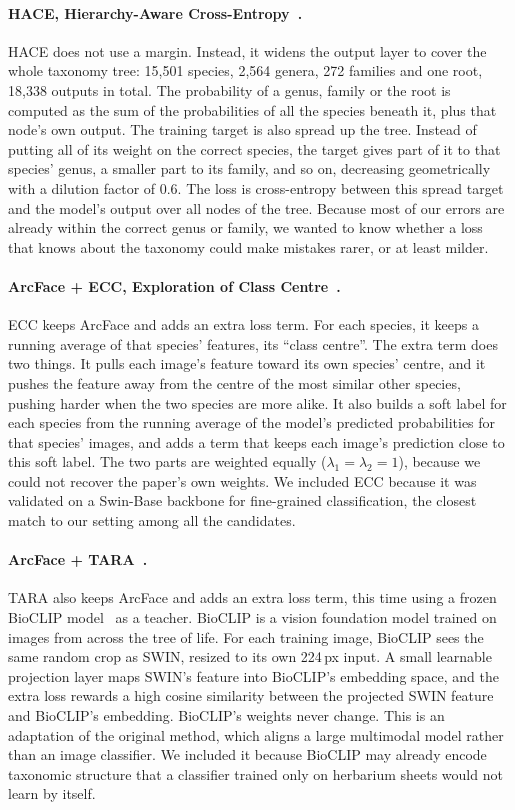 \documentclass[11pt]{article}
\begin{document}
\paragraph{HACE, Hierarchy-Aware Cross-Entropy~\citep{hace}.} HACE does not use a margin.
Instead, it widens the output layer to cover the whole taxonomy tree: 15{,}501 species,
2{,}564 genera, 272 families and one root, 18{,}338 outputs in total. The probability of
a genus, family or the root is computed as the sum of the probabilities of all the
species beneath it, plus that node's own output. The training target is also spread up
the tree. Instead of putting all of its weight on the correct species, the target gives
part of it to that species' genus, a smaller part to its family, and so on, decreasing
geometrically with a dilution factor of 0.6. The loss is cross-entropy between this
spread target and the model's output over all nodes of the tree. Because most of our
errors are already within the correct genus or family, we wanted to know whether a loss
that knows about the taxonomy could make mistakes rarer, or at least milder.

\paragraph{ArcFace + ECC, Exploration of Class Centre~\citep{ecc}.} ECC keeps ArcFace and
adds an extra loss term. For each species, it keeps a running average of that species'
features, its ``class centre''. The extra term does two things. It pulls each image's
feature toward its own species' centre, and it pushes the feature away from the centre of
the most similar other species, pushing harder when the two species are more alike. It
also builds a soft label for each species from the running average of the model's
predicted probabilities for that species' images, and adds a term that keeps each
image's prediction close to this soft label. The two parts are weighted equally
($\lambda_1 = \lambda_2 = 1$), because we could not recover the paper's own weights. We
included ECC because it was validated on a Swin-Base backbone for fine-grained
classification, the closest match to our setting among all the candidates.

\paragraph{ArcFace + TARA~\citep{tara}.} TARA also keeps ArcFace and adds an extra loss
term, this time using a frozen BioCLIP model~\citep{bioclip} as a teacher. BioCLIP is a
vision foundation model trained on images from across the tree of life. For each
training image, BioCLIP sees the same random crop as SWIN, resized to its own 224\,px
input. A small learnable projection layer maps SWIN's feature into BioCLIP's embedding
space, and the extra loss rewards a high cosine similarity between the projected SWIN
feature and BioCLIP's embedding. BioCLIP's weights never change. This is an adaptation
of the original method, which aligns a large multimodal model rather than an image
classifier. We included it because BioCLIP may already encode taxonomic structure that a
classifier trained only on herbarium sheets would not learn by itself.
\end{document}
